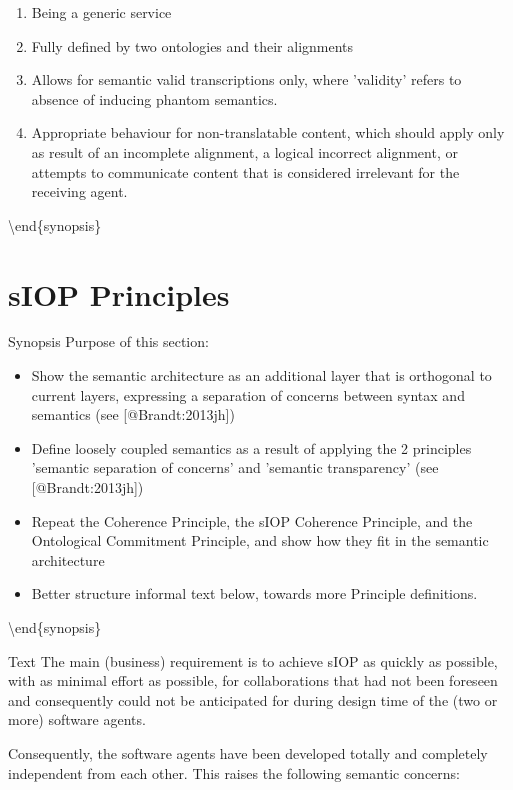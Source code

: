 \documentclass[a4paper,11pt,oneside,oldfontcommands]{memoir}
\newcounter{para}
\theoremstyle{definition}
\theoremstyle{break}		%
\numberwithin{equation}{chapter}
\numberwithin{figure}{chapter}
\begin{document}
\begin{enumerate}
\item Being a generic service
\item Fully defined by two ontologies and their alignments
\item Allows for semantic valid transcriptions only, where 'validity' refers to absence of inducing phantom semantics.
\item Appropriate behaviour for non-translatable content, which should apply only as result of an incomplete alignment, a logical incorrect alignment, or attempts to communicate content that is considered irrelevant for the receiving agent.
\end{enumerate}

\textbackslash{}end\{synopsis\}

\hypertarget{siop-principles}{%
\chapter{sIOP Principles}\label{siop-principles}}

Synopsis Purpose of this section:

\begin{itemize}
\item Show the semantic architecture as an additional layer that is orthogonal to current layers, expressing a separation of concerns between syntax and semantics (see [@Brandt:2013jh])
\item Define loosely coupled semantics as a result of applying the 2 principles 'semantic separation of concerns' and 'semantic transparency' (see [@Brandt:2013jh])
\item Repeat the Coherence Principle, the sIOP Coherence Principle, and the Ontological Commitment Principle, and show how they fit in the semantic architecture
\item Better structure informal text below, towards more Principle definitions.
\end{itemize}

\textbackslash{}end\{synopsis\}

Text The main (business) requirement is to achieve sIOP as quickly as
possible, with as minimal effort as possible, for collaborations that
had not been foreseen and consequently could not be anticipated for
during design time of the (two or more) software agents.

Consequently, the software agents have been developed totally and
completely independent from each other. This raises the following
semantic concerns:
\end{document}
